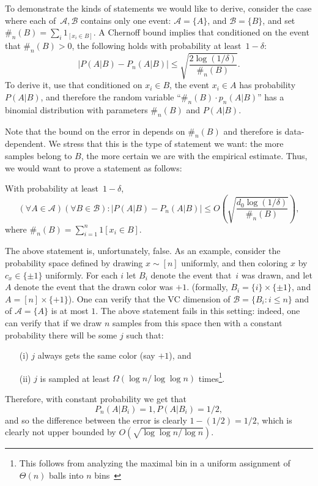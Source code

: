 \documentclass{article}
\def\B{{\mathcal B}}
\newcommand{\cA}{\mathcal{A}}
\newcommand{\cB}{\mathcal{B}}
\begin{document}
To demonstrate the kinds of statements we would like to derive,
consider the case where each of~$\cA,\cB$ contains only one event:
$\cA=\{A\}$, and $\cB=\{B\}$,
and set $\#_n(B)=\sum_i 1_{[x_i\in B]}$.
A Chernoff bound implies that conditioned on the event that $\#_n(B)>0$, 
the following holds with probability at least~$1-\delta$:
\begin{equation}\label{eq:chernoff}
\left\lvert P(A\vert B) - P_n(A \vert B) \right\rvert \leq \sqrt{\frac{2\log(1/\delta)}{\#_n(B)}}.
\end{equation}
To derive it, use that conditioned on $x_i\in B$, the event $x_i\in A$ has probability $P(A\vert B)$, 
and therefore the random variable ``$\#_n(B)\cdot p_n(A \vert B)$'' has a binomial distribution with parameters $\#_n(B)$ and $P(A\vert B)$.

Note that the bound on the error in  depends on $\#_n(B)$ and therefore is data-dependent.
We stress that this is the type of statement we want:
the more samples belong to $B$, the more certain we are with the empirical estimate.
Thus, we would want to prove a statement as follows:

With probability at least~$1-\delta$,
\[\left(\forall A\in\cA\right)\left(\forall B\in\B\right):\left\lvert P(A \vert B) - P_n(A \vert B) \right\rvert \leq O\left(\sqrt{\frac{d_0 \log(1/\delta)}{\#_n(B)}}\right),\]
where $\#_n(B) = \sum_{i=1}^n 1[x_i\in B]$.

The above statement is, unfortunately, false. 
As an example, consider the probability space defined by drawing $x \sim[n]$ uniformly,
and then coloring $x$ by $c_x\in\{\pm 1\}$ uniformly.
For each $i$ let $B_i$ denote the event that~$i$ was drawn,
and let $A$ denote the event that the drawn color was  $+1$.
(formally, $B_i = \{i\}\times\{\pm 1\}$, and $A=[n]\times\{+1\}$).
One can verify that the VC dimension of $\B=\{B_i : i\leq n\}$ and of $\cA=\{A\}$ is at most $1$.
The above statement fails in this setting:
indeed, one can verify that if we draw $n$ samples from this space 
then with a constant probability there will be some  $j$
such that: 
\begin{itemize}
\item[(i)] $j$ always gets the same color (say $+1$), and 
\item[(ii)] $j$ is sampled at least $\Omega(\log n/\log\log n)$ times\footnote{{This follows from analyzing the maximal bin
in a uniform assignment of $\Theta(n)$ balls into $n$ bins~\cite{bins}}}.
\end{itemize}
Therefore, with constant probability we get that 
\[P_n(A\vert B_i) = 1, P(A\vert B_i)=1/2,\]
and so the difference between the error is clearly $1-(1/2)=1/2$,
which is clearly not upper bounded by $O(\sqrt{\log\log n/\log n})$.
\end{document}
